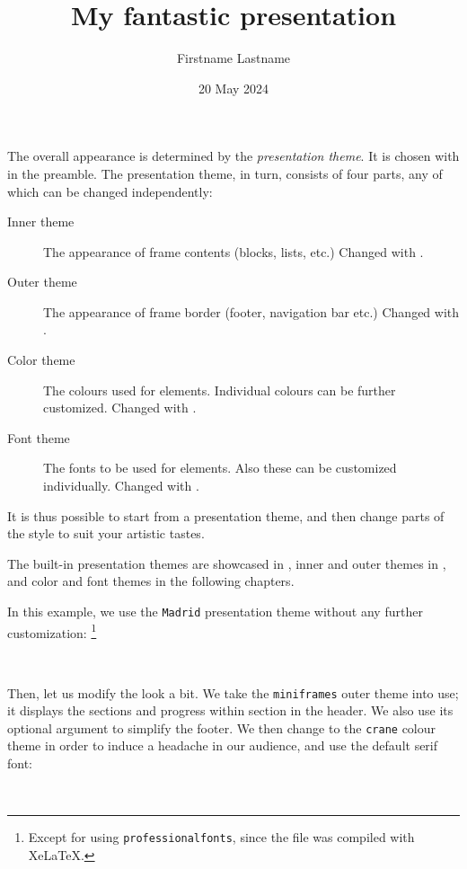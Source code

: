 The overall appearance is determined by the \emph{presentation theme}.
It is chosen with  in the preamble.
The presentation theme, in turn, consists of four parts, any of which can be changed independently:
\begin{description}
\item[Inner theme] The appearance of frame contents (blocks, lists, etc.)
    Changed with .
\item[Outer theme] The appearance of frame border (footer, navigation bar etc.)
    Changed with .
\item[Color theme] The colours used for elements.
    Individual colours can be further customized.
    Changed with .
\item[Font theme] The fonts to be used for elements.
    Also these can be customized individually.
    Changed with .
\end{description}
%
It is thus possible to start from a presentation theme,
and then change parts of the style to suit your artistic tastes.

The built-in presentation themes are showcased in \cite[Chapter~15]{beamer},
inner and outer themes in \cite[Chapter~16]{beamer},
and color and font themes in the following chapters.

In this example, we use the \verb|Madrid| presentation theme without any further customization:%
\footnote{Except for using \texttt{professionalfonts}, since the file was compiled with XeLaTeX.}
%
\begin{ExampleCode}
\title{My fantastic presentation}
\author[F.~Lastname]{Firstname Lastname}
\date{20 May 2024}

\beamertemplatenavigationsymbolsempty
{}
\end{ExampleCode}
%
\begin{center}
~
\end{center}

Then, let us modify the look a bit.
We take the \verb|miniframes| outer theme into use;
it displays the sections and progress within section in the header.
We also use its optional argument to simplify the footer.
We then change to the \verb|crane| colour theme in order to induce a headache in our audience,
and use the default serif font:
%
\begin{ExampleCode}
\beamertemplatenavigationsymbolsempty
{}
\end{ExampleCode}
%
\begin{center}
~
\end{center}



